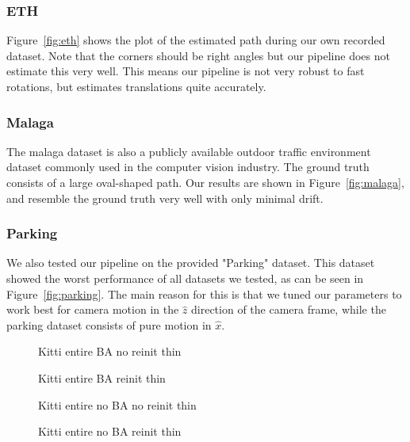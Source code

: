 \documentclass[11pt]{article}
\newlength\figureheight
\newlength\figurewidth
\begin{document}
\subsubsection{ETH}
Figure~\ref{fig:eth} shows the plot of the estimated path during our own recorded dataset. Note that the corners should be right angles but our pipeline does not estimate this very well. This means our pipeline is not very robust to fast rotations, but estimates translations quite accurately.

\subsubsection{Malaga}
The malaga dataset is also a publicly available outdoor traffic environment dataset commonly used in the computer vision industry. The ground truth consists of a large oval-shaped path. Our results are shown in Figure~\ref{fig:malaga}, and resemble the ground truth very well with only minimal drift.

\subsubsection{Parking}
We also tested our pipeline on the provided "Parking" dataset. This dataset showed the worst performance of all datasets we tested, as can be seen in Figure~\ref{fig:parking}. The main reason for this is that we tuned our parameters to work best for camera motion in the $\hat{z}$ direction of the camera frame, while the parking dataset consists of pure motion in $\hat{x}$.

\begin{figure}[h]
	\centering
	\setlength\figureheight{10cm} 
	\setlength\figurewidth{15cm}
	
	\caption{Kitti entire BA no reinit thin}
	\label{fig:Kitti_entire_BA_no_reinit_thin}
\end{figure}

\begin{figure}[h]
	\centering
	\setlength\figureheight{10cm} 
	\setlength\figurewidth{15cm}
	
	\caption{Kitti entire BA reinit thin}
	\label{fig:Kitti_entire_BA_reinit_thin}
\end{figure}

\begin{figure}[h]
	\centering
	\setlength\figureheight{10cm} 
	\setlength\figurewidth{15cm}
	
	\caption{Kitti entire no BA no reinit thin}
	\label{fig:Kitti_entire_no_BA_no_reinit_thin}
\end{figure}

\begin{figure}[h]
	\centering
	\setlength\figureheight{10cm} 
	\setlength\figurewidth{15cm}
	
	\caption{Kitti entire no BA reinit thin}
	\label{fig:Kitti_entire_no_BA_reinit_thin}
\end{figure}
\end{document}
